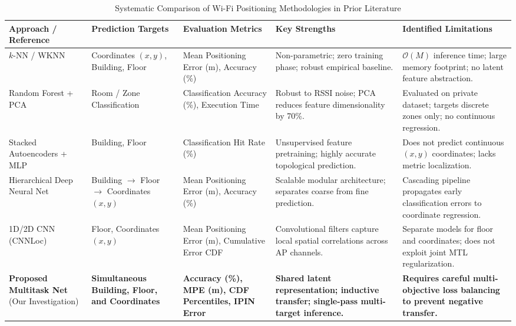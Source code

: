 \begin{table}[!t]
\centering
\caption{Systematic Comparison of Wi-Fi Positioning Methodologies in Prior Literature}
\label{tab:lit-matrix}
\begin{tabular}{lp{3.4cm}p{2.6cm}p{3.2cm}p{3.8cm}}
\toprule
\textbf{Approach / Reference} & \textbf{Prediction Targets} & \textbf{Evaluation Metrics} & \textbf{Key Strengths} & \textbf{Identified Limitations} \\
\midrule
$k$-NN / WKNN \newline \cite{torres2014ujiindoorloc, torres2015comprehensive} & 
Coordinates $(x, y)$, \newline Building, Floor & 
Mean Positioning Error (m), Accuracy (\%) & 
Non-parametric; zero training phase; robust empirical baseline. & 
$\mathcal{O}(M)$ inference time; large memory footprint; no latent feature abstraction. \\
\midrule
Random Forest + PCA \newline \cite{salamah2016enhanced} & 
Room / Zone Classification & 
Classification Accuracy (\%), Execution Time & 
Robust to RSSI noise; PCA reduces feature dimensionality by 70\%. & 
Evaluated on private dataset; targets discrete zones only; no continuous regression. \\
\midrule
Stacked Autoencoders + MLP \newline \cite{nowicki2017low} & 
Building, Floor & 
Classification Hit Rate (\%) & 
Unsupervised feature pretraining; highly accurate topological prediction. & 
Does not predict continuous $(x, y)$ coordinates; lacks metric localization. \\
\midrule
Hierarchical Deep Neural Net \newline \cite{kim2018scalable} & 
Building $\to$ Floor $\to$ \newline Coordinates $(x, y)$ & 
Mean Positioning Error (m), Accuracy (\%) & 
Scalable modular architecture; separates coarse from fine prediction. & 
Cascading pipeline propagates early classification errors to coordinate regression. \\
\midrule
1D/2D CNN (CNNLoc) \newline \cite{song2019cnnloc} & 
Floor, Coordinates $(x, y)$ & 
Mean Positioning Error (m), Cumulative Error CDF & 
Convolutional filters capture local spatial correlations across AP channels. & 
Separate models for floor and coordinates; does not exploit joint MTL regularization. \\
\midrule
\textbf{Proposed Multitask Net} \newline (Our Investigation) & 
\textbf{Simultaneous Building, \newline Floor, and Coordinates} & 
\textbf{Accuracy (\%), MPE (m), \newline CDF Percentiles, IPIN Error} & 
\textbf{Shared latent representation; inductive transfer; single-pass multi-target inference.} & 
\textbf{Requires careful multi-objective loss balancing to prevent negative transfer.} \\
\bottomrule
\end{tabular}
\end{table}
